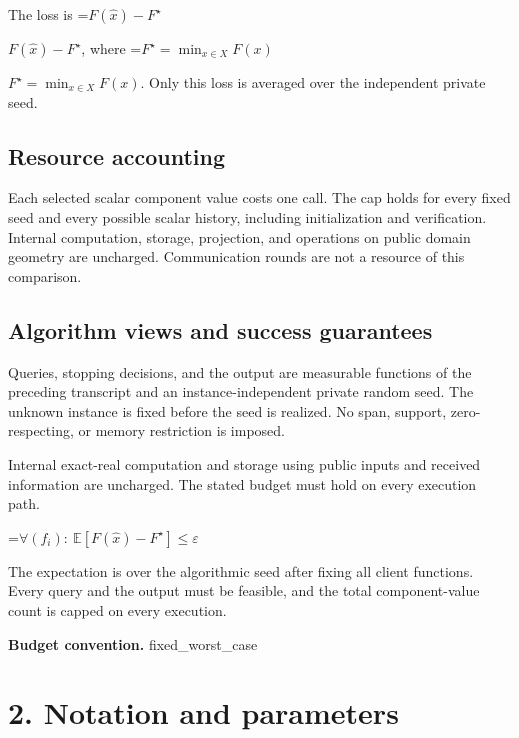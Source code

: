 \documentclass[10pt,a4paper]{article}
\newcommand{\AtlasMath}[1]{\par\begingroup\centering\setbox0=\hbox{$\displaystyle #1$}\ifdim\wd0>1.4\linewidth\typeout{ATLAS WIDE FORMULA: \the\wd0}\fi\ifdim\wd0>\linewidth\resizebox{\linewidth}{!}{\box0}\else\box0\fi\par\endgroup}
\newcommand{\AtlasInlineMath}[1]{\begingroup\setbox0=\hbox{$#1$}\ifdim\wd0>.4\linewidth\endgroup\AtlasMath{#1}\else\endgroup$#1$\fi}
\begin{document}
The loss is \AtlasInlineMath{F(\widehat x)-F^\star}, where \AtlasInlineMath{F^\star=\min_{x\in X}F(x)}. Only this loss is averaged over the independent private seed.



\subsection{Resource accounting}


Each selected scalar component value costs one call. The cap holds for every fixed seed and every possible scalar history, including initialization and verification. Internal computation, storage, projection, and operations on public domain geometry are uncharged. Communication rounds are not a resource of this comparison.



\subsection{Algorithm views and success guarantees}


Queries, stopping decisions, and the output are measurable functions of the preceding transcript and an instance-independent private random seed. The unknown instance is fixed before the seed is realized. No span, support, zero-respecting, or memory restriction is imposed.



Internal exact-real computation and storage using public inputs and received information are uncharged. The stated budget must hold on every execution path.




\AtlasMath{\forall(f_i):\ \mathbb E[F(\widehat x)-F^\star]\le\varepsilon}




The expectation is over the algorithmic seed after fixing all client functions. Every query and the output must be feasible, and the total component-value count is capped on every execution.



\textbf{Budget convention.} fixed\_worst\_case



\section{2. Notation and parameters}
\end{document}
